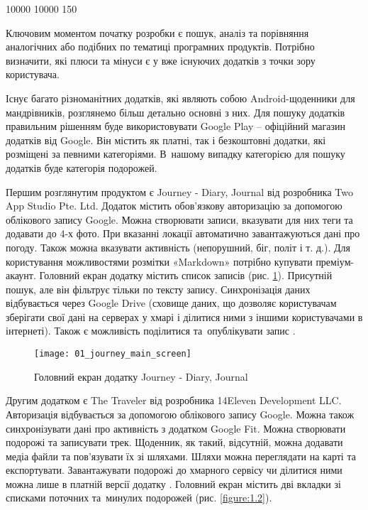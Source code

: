 \documentclass[../main.tex]{subfiles}
\begin{document}
{

 10000 10000 150 %

Ключовим моментом початку розробки є пошук, аналіз та порівняння аналогічних або подібних по тематиці програмних продуктів. Потрібно визначити, які плюси та мінуси є у вже існуючих додатків з точки зору користувача.

Існує багато різноманітних додатків, які являють собою Android-щоденники для мандрівників, розглянемо більш детально основні з них. Для пошуку додатків правильним рішенням буде використовувати Google Play -- офіційний магазин додатків від Google. Він містить як платні, так і безкоштовні додатки, які розміщені за певними категоріями. В~нашому випадку категорією для пошуку додатків буде категорія подорожей.

Першим розглянутим продуктом є Journey - Diary, Journal від розробника Two App Studio Pte. Ltd. Додаток містить обов'язкову авторизацію за допомогою облікового запису Google. Можна створювати записи, вказувати для них теги та додавати до 4-х фото. При вказанні локації автоматично завантажуються дані про погоду. Також можна вказувати активність (непорушний, біг, політ і т. д.). Для користування можливостями розмітки «Markdown» потрібно купувати преміум-акаунт. Головний екран додатку містить список записів (рис. \ref{figure:1.1}). Присутній пошук, але він фільтрує тільки по тексту запису. Синхронізація даних відбувається через Google Drive (сховище даних, що дозволяє користувачам зберігати свої дані на серверах у хмарі і ділитися ними з іншими користувачами в інтернеті). Також є можливість поділитися та~опублікувати запис \cite{journey_app}. 

\begin{figure}[H]
\centering
\texttt{[image: 01\_journey\_main\_screen]}
\caption{Головний екран додатку Journey - Diary, Journal}
\label{figure:1.1}
\end{figure}

\newpage
Другим додатком є The Traveler від розробника 14Eleven Development LLC. Авторизація відбувається за допомогою облікового запису Google. Можна також синхронізувати дані про активність з додатком Google Fit. Можна створювати подорожі та записувати трек. Щоденник, як такий, відсутній, можна додавати медіа файли та пов'язувати їх зі шляхами. Шляхи можна переглядати на карті та експортувати. Завантажувати подорожі до хмарного сервісу чи ділитися ними можна лише в платній версії додатку \cite{the_traveler_app}. Головний екран містить дві вкладки зі списками поточних та~минулих подорожей (рис. \ref{figure:1.2}). 

}
\end{document}

